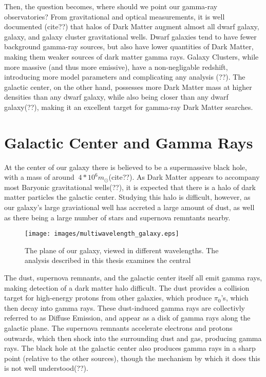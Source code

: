 Then, the question becomes, where should we point our gamma-ray observatories?
From gravitational and optical measurements, it is well documented (cite??) that halos of Dark Matter augment almost all dwarf galaxy, galaxy, and galaxy cluster gravitational wells.
Dwarf galaxies tend to have fewer background gamma-ray sources, but also have lower quantities of Dark Matter, making them weaker sources of dark matter gamma rays.
Galaxy Clusters, while more massive (and thus more emissive), have a non-negligable redshift, introducing more model parameters and complicating any analysis (??).
The galactic center, on the other hand, possesses more Dark Matter mass at higher densities than any dwarf galaxy, while also being closer than any dwarf galaxy(??), making it an excellent target for gamma-ray Dark Matter searches.


\section{Galactic Center and Gamma Rays}

At the center of our galaxy there is believed to be a supermassive black hole, with a mass of around $~4*10^6m_{\odot}$(cite??).
As Dark Matter appears to accompany most Baryonic gravitational wells(??), it is expected that there is a halo of dark matter particles the galactic center.
Studying this halo is difficult, however, as our galaxy's large graviational well has accreted a large amount of dust, as well as there being a large number of stars and supernova remntants nearby.

\begin{figure}[h]
  \begin{center}
    \texttt{[image: images/multiwavelength\_galaxy.eps]}
    \caption[Multiwavelength Milky Way]{The plane of our galaxy, viewed in different wavelengths.  The analysis described in this thesis examines the central \degree\cite{milky_way}}
  \end{center}
\end{figure}

The dust, supernova remnants, and the galactic center itself all emit gamma rays, making detection of a dark matter halo difficult.
The dust provides a collision target for high-energy protons from other galaxies, which produce $\pi_0$'s, which then decay into gamma rays.
These dust-induced gamma rays are collectivly referred to as Diffuse Emission, and appear as a disk of gamma rays along the galactic plane.
The supernova remnants accelerate electrons and protons outwards, which then shock into the surrounding dust and gas, producing gamma rays.
The black hole at the galactic center also produces gamma rays in a sharp point (relative to the other sources), though the mechanism by which it does this is not well understood(??).

